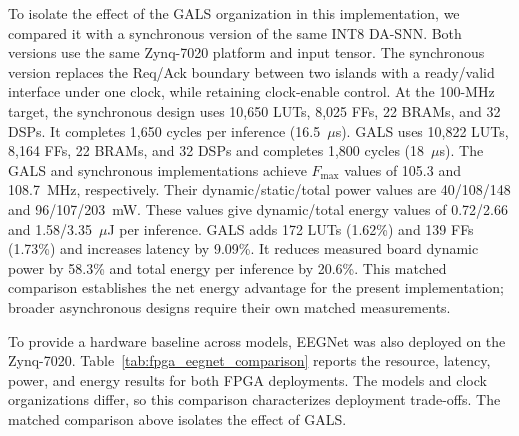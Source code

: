 \documentclass[12pt]{article}
\providecommand{\DIFaddtex}[1]{{\protect\color{blue}\sf #1}}
\providecommand{\DIFadd}[1]{\texorpdfstring{\DIFaddtex{#1}}{#1}}
\begin{document}
\DIFadd{To isolate the effect of the GALS organization in this implementation, we compared it with a synchronous version of the same INT8 DA-SNN. Both versions use the same Zynq-7020 platform and input tensor. The synchronous version replaces the Req/Ack boundary between two islands with a ready/valid interface under one clock, while retaining clock-enable control. At the 100-MHz target, the synchronous design uses 10,650 LUTs, 8,025 FFs, 22 BRAMs, and 32 DSPs. It completes 1,650 cycles per inference (16.5~$\mu$s). GALS uses 10,822 LUTs, 8,164 FFs, 22 BRAMs, and 32 DSPs and completes 1,800 cycles (18~$\mu$s). The GALS and synchronous implementations achieve $F_{\max}$ values of 105.3 and 108.7~MHz, respectively. Their dynamic/static/total power values are 40/108/148 and 96/107/203~mW. These values give dynamic/total energy values of 0.72/2.66 and 1.58/3.35~$\mu$J per inference. GALS adds 172 LUTs (1.62\%) and 139 FFs (1.73\%) and increases latency by 9.09\%. It reduces measured board dynamic power by 58.3\% and total energy per inference by 20.6\%. This matched comparison establishes the net energy advantage for the present implementation; broader asynchronous designs require their own matched measurements.
}

\DIFadd{To provide a hardware baseline across models, EEGNet was also deployed on the Zynq-7020. Table~\ref{tab:fpga_eegnet_comparison} reports the resource, latency, power, and energy results for both FPGA deployments. The models and clock organizations differ, so this comparison characterizes deployment trade-offs. The matched comparison above isolates the effect of GALS.
}
\end{document}
